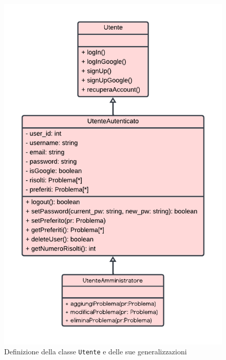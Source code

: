 \documentclass[11pt, a4paper]{article}
\theoremstyle{definition} %
\begin{document}
\begin{figure}[H]
\centering
\includegraphics[scale = 0.67]{materiale/class-utenti.pdf}
\caption{Definizione della classe \texttt{Utente} e delle sue generalizzazioni}
\label{utenti}
\end{figure}
\end{document}
